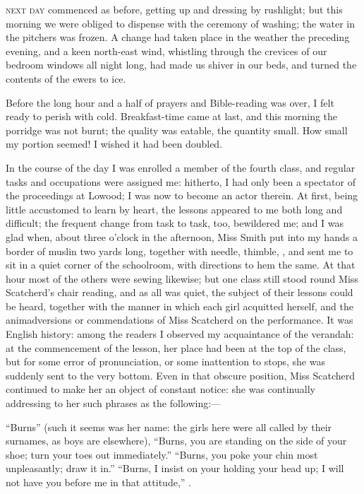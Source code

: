 
 \textsc{next day} commenced as before, getting up and dressing by rushlight;
but this morning we were obliged to dispense with the ceremony of
washing; the water in the pitchers was frozen.  A change had taken place
in the weather the preceding evening, and a keen north-east wind,
whistling through the crevices of our bedroom windows all night long,
had made us shiver in our beds, and turned the contents of the ewers to
ice.

Before the long hour and a half of prayers and Bible-reading was over, I
felt ready to perish with cold.  Breakfast-time came at last, and this
morning the porridge was not burnt; the quality was eatable, the
quantity small.  How small my portion seemed!  I wished it had been
doubled.

In the course of the day I was enrolled a member of the fourth class,
and regular tasks and occupations were assigned me: hitherto, I had only
been a spectator of the proceedings at Lowood; I was now to become an
actor therein.  At first, being little accustomed to learn by heart, the
lessons appeared to me both long and difficult; the frequent change from
task to task, too, bewildered me; and I was glad when, about three
o'clock in the afternoon, Miss Smith put into my hands a border of
muslin two yards long, together with needle, thimble, \etc, and sent me
to sit in a quiet corner of the schoolroom, with directions to hem the
same.  At that hour most of the others were sewing likewise; but one
class still stood round Miss Scatcherd's chair reading, and as all was
quiet, the subject of their lessons could be heard, together with the
manner in which each girl acquitted herself, and the animadversions or
commendations of Miss Scatcherd on the performance.  It was English
history: among the readers I observed my acquaintance of the verandah:
at the commencement of the lesson, her place had been at the top of the
class, but for some error of pronunciation, or some inattention to
stops, she was suddenly sent to the very bottom.  Even in that obscure
position, Miss Scatcherd continued to make her an object of constant
notice: she was continually addressing to her such phrases as the
following:---

\enquote{Burns} (such it seems was her name: the girls here were all
called by their surnames, as boys are elsewhere), \enquote{Burns, you
are standing on the side of your shoe; turn your toes out immediately.} 
\enquote{Burns, you poke your chin most unpleasantly; draw it in.} 
\enquote{Burns, I insist on your holding your head up; I will not have
you before me in that attitude,} \etc{} \etc.

